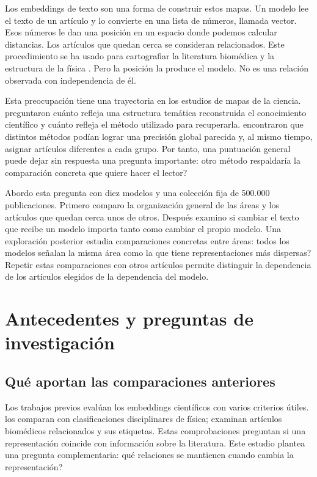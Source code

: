 \documentclass[12pt]{article}
\begin{document}
Los embeddings de texto son una forma de construir estos mapas. Un modelo lee el texto de un artículo y lo convierte en una lista de números, llamada vector. Esos números le dan una posición en un espacio donde podemos calcular distancias. Los artículos que quedan cerca se consideran relacionados. Este procedimiento se ha usado para cartografiar la literatura biomédica y la estructura de la física \citep{refbe130e2973,refc0e2cc29e0}. Pero la posición la produce el modelo. No es una relación observada con independencia de él.

Esta preocupación tiene una trayectoria en los estudios de mapas de la ciencia. \citet{refa0d2d707e6} preguntaron cuánto refleja una estructura temática reconstruida el conocimiento científico y cuánto refleja el método utilizado para recuperarla. \citet{ref6a2f5912bc} encontraron que distintos métodos podían lograr una precisión global parecida y, al mismo tiempo, asignar artículos diferentes a cada grupo. Por tanto, una puntuación general puede dejar sin respuesta una pregunta importante: \textquestiondown{}otro método respaldaría la comparación concreta que quiere hacer el lector?

Abordo esta pregunta con diez modelos y una colección fija de 500.000 publicaciones. Primero comparo la organización general de las áreas y los artículos que quedan cerca unos de otros. Después examino si cambiar el texto que recibe un modelo importa tanto como cambiar el propio modelo. Una exploración posterior estudia comparaciones concretas entre áreas: \textquestiondown{}todos los modelos señalan la misma área como la que tiene representaciones más dispersas? Repetir estas comparaciones con otros artículos permite distinguir la dependencia de los artículos elegidos de la dependencia del modelo.

\section{Antecedentes y preguntas de investigación}
\subsection{Qué aportan las comparaciones anteriores}
Los trabajos previos evalúan los embeddings científicos con varios criterios útiles. \citet{refc0e2cc29e0} los comparan con clasificaciones disciplinares de física; \citet{refbe130e2973} examinan artículos biomédicos relacionados y sus etiquetas. Estas comprobaciones preguntan si una representación coincide con información sobre la literatura. Este estudio plantea una pregunta complementaria: \textquestiondown{}qué relaciones se mantienen cuando cambia la representación?
\end{document}
